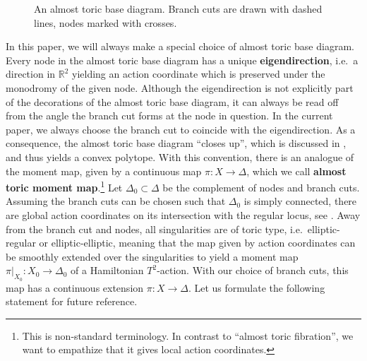 \documentclass[AIF,Unicode,manuscript]{cedram}
\begin{document}
\begin{figure}
  \centering
  \caption{An almost toric base diagram.
Branch cuts are drawn with dashed lines, nodes marked with crosses.}
  \label{fig:atf_example}
\end{figure}

In this paper, we will always make a special choice of almost toric base diagram.
Every node in the almost toric base diagram has a unique \textbf{eigendirection}, i.e.\ a direction in $\mathbb{R}^2$ yielding an action coordinate which is preserved under the monodromy of the given node.
Although the eigendirection is not explicitly part of the decorations of the almost toric base diagram, it can always be read off from the angle the branch cut forms at the node in question.
In the current paper, we always choose the branch cut to coincide with the eigendirection.
As a consequence, the almost toric base diagram ``closes up'', which is discussed in \cite[Section 7.2]{evans2021atfs}, and thus yields a convex polytope.
With this convention, there is an analogue of the moment map, given by a continuous map $\pi \colon X \rightarrow \Delta$, which we call \textbf{almost toric moment map}.\footnote{This is non-standard terminology. In contrast to ``almost toric fibration'', we want to empathize that it gives local action coordinates.}
Let $\Delta_0 \subset \Delta$ be the complement of nodes and branch cuts.
Assuming the branch cuts can be chosen such that $\Delta_0$ is simply connected, there are global action coordinates on its intersection with the regular locus, see \cite{Dui80}.
Away from the branch cut and nodes, all singularities are of toric type, i.e.\ elliptic-regular or elliptic-elliptic, meaning that the map given by action coordinates can be smoothly extended over the singularities to yield a moment map $\pi\vert_{X_0} \colon X_0 \rightarrow \Delta_0$ of a Hamiltonian $T^2$-action.
With our choice of branch cuts, this map has a continuous extension $\pi \colon X \rightarrow \Delta$.
Let us formulate the following statement for future reference.
\end{document}
